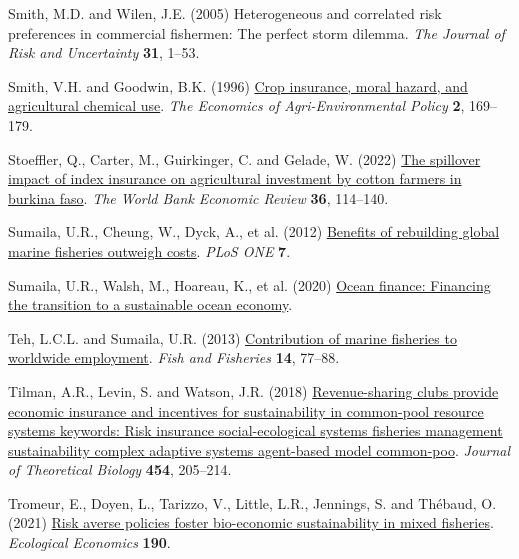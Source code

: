 \documentclass[
  letterpaper,
  DIV=11,
  numbers=noendperiod]{scrartcl}
\newlength{\cslhangindent}
\newlength{\cslentryspacingunit} %
\newenvironment{CSLReferences}[2] %
 {%
  \setlength{\parindent}{0pt}
  \ifodd #1
  \let\oldpar\par
  \def\par{\hangindent=\cslhangindent\oldpar}
  \fi
  \setlength{\parskip}{#2\cslentryspacingunit}
 }%
 {}
\theoremstyle{plain}
\theoremstyle{plain}
\theoremstyle{remark}
\begin{document}
\begin{CSLReferences}{1}{0}
\leavevmode{}%
Smith, M.D. and Wilen, J.E. (2005) Heterogeneous and correlated risk
preferences in commercial fishermen: The perfect storm dilemma.
\emph{The Journal of Risk and Uncertainty} \textbf{31}, 1--53.

\leavevmode{}%
Smith, V.H. and Goodwin, B.K. (1996)
\href{https://doi.org/10.2307/1243714}{Crop insurance, moral hazard, and
agricultural chemical use}. \emph{The Economics of Agri-Environmental
Policy} \textbf{2}, 169--179.

\leavevmode{}%
Stoeffler, Q., Carter, M., Guirkinger, C. and Gelade, W. (2022)
\href{https://doi.org/10.1093/wber}{The spillover impact of index
insurance on agricultural investment by cotton farmers in burkina faso}.
\emph{The World Bank Economic Review} \textbf{36}, 114--140.

\leavevmode{}%
Sumaila, U.R., Cheung, W., Dyck, A., et al. (2012)
\href{https://doi.org/10.1371/journal.pone.0040542}{Benefits of
rebuilding global marine fisheries outweigh costs}. \emph{PLoS ONE}
\textbf{7}.

\leavevmode{}%
Sumaila, U.R., Walsh, M., Hoareau, K., et al. (2020)
\href{https://www.oceanpanel.org/blue-}{Ocean finance: Financing the
transition to a sustainable ocean economy}.

\leavevmode{}%
Teh, L.C.L. and Sumaila, U.R. (2013)
\href{https://doi.org/10.1111/j.1467-2979.2011.00450.x}{Contribution of
marine fisheries to worldwide employment}. \emph{Fish and Fisheries}
\textbf{14}, 77--88.

\leavevmode{}%
Tilman, A.R., Levin, S. and Watson, J.R. (2018)
\href{https://doi.org/10.1016/j.jtbi.2018.06.003}{Revenue-sharing clubs
provide economic insurance and incentives for sustainability in
common-pool resource systems keywords: Risk insurance social-ecological
systems fisheries management sustainability complex adaptive systems
agent-based model common-poo}. \emph{Journal of Theoretical Biology}
\textbf{454}, 205--214.

\leavevmode{}%
Tromeur, E., Doyen, L., Tarizzo, V., Little, L.R., Jennings, S. and
Thébaud, O. (2021)
\href{https://doi.org/10.1016/j.ecolecon.2021.107178}{Risk averse
policies foster bio-economic sustainability in mixed fisheries}.
\emph{Ecological Economics} \textbf{190}.


\end{CSLReferences}
\end{document}
